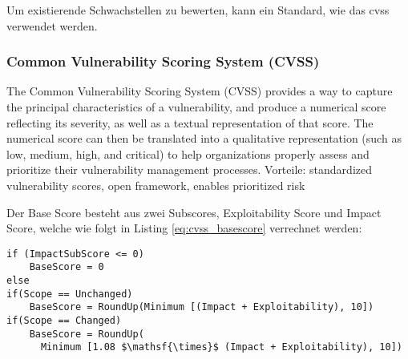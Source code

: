 	\noindent Um existierende Schwachstellen zu bewerten, kann ein Standard, wie das \gls{cvss} verwendet werden.
	
\subsubsection{Common Vulnerability Scoring System (CVSS)}
\label{sec:sota_sa_cvss}
    The Common Vulnerability Scoring System (CVSS) provides a way to capture the principal characteristics of a vulnerability, and produce a numerical score reflecting its severity, as well as a textual representation of that score. The numerical score can then be translated into a qualitative representation (such as low, medium, high, and critical) to help organizations properly assess and prioritize their vulnerability management processes.
    Vorteile: standardized vulnerability scores, open framework, enables prioritized risk\cite{CVSSspec}
    
    
    \noindent Der Base Score besteht aus zwei Subscores, Exploitability Score und Impact Score, welche wie folgt in Listing \ref{eq:cvss_basescore} verrechnet werden:
    \begin{lstlisting}[caption={Berechnung des BaseScore \cite{CVSSspec}},label=eq:cvss_basescore,captionpos=b,mathescape=true]
if (ImpactSubScore <= 0)
    BaseScore = 0
else
if(Scope == Unchanged)
    BaseScore = RoundUp(Minimum [(Impact + Exploitability), 10])
if(Scope == Changed)
    BaseScore = RoundUp(
      Minimum [1.08 $\mathsf{\times}$ (Impact + Exploitability), 10])
    \end{lstlisting}
    
